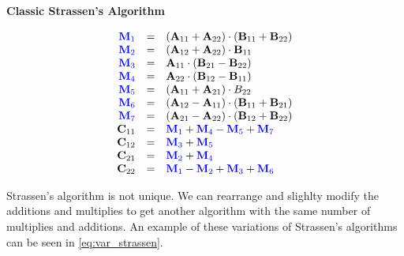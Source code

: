     \begin{center}
        \textbf{Classic Strassen's Algorithm}
        \vspace{-20pt}
    \end{center}
    \begin{equation}
        \begin{array}{rcl}
            \color{blue} \mathbf{M}_1 & = & (\mathbf{A}_{11} + \mathbf{A}_{22})\cdot (\mathbf{B}_{11} + \mathbf{B}_{22}) \\
            \color{blue} \mathbf{M}_2 & = & (\mathbf{A}_{12} + \mathbf{A}_{22})\cdot \mathbf{B}_{11} \\
            \color{blue} \mathbf{M}_3 & = & \mathbf{A}_{11}\cdot (\mathbf{B}_{21} - \mathbf{B}_{22}) \\
            \color{blue} \mathbf{M}_4 & = & \mathbf{A}_{22}\cdot (\mathbf{B}_{12} - \mathbf{B}_{11}) \\
            \color{blue} \mathbf{M}_5 & = & (\mathbf{A}_{11} + \mathbf{A}_{21})\cdot B_{22} \\
            \color{blue} \mathbf{M}_6 & = & (\mathbf{A}_{12} - \mathbf{A}_{11})\cdot (\mathbf{B}_{11} + \mathbf{B}_{21}) \\
            \color{blue} \mathbf{M}_7 & = & (\mathbf{A}_{21} - \mathbf{A}_{22})\cdot (\mathbf{B}_{12} + \mathbf{B}_{22}) \\
            \mathbf{C}_{11} & = & \color{blue} \mathbf{M}_1 \color{black} + \color{blue} \mathbf{M}_4 \color{black} - \color{blue} \mathbf{M}_5 \color{black} + \color{blue} \mathbf{M}_7 \\
            \mathbf{C}_{12} & = & \color{blue} \mathbf{M}_3 \color{black} + \color{blue} \mathbf{M}_5 \\
            \mathbf{C}_{21} & = & \color{blue} \mathbf{M}_2 \color{black} + \color{blue} \mathbf{M}_4 \\
            \mathbf{C}_{22} & = & \color{blue} \mathbf{M}_1 \color{black} - \color{blue} \mathbf{M}_2 \color{black} + \color{blue} \mathbf{M}_3 \color{black} + \color{blue} \mathbf{M}_6
        \end{array}
        \label{eq:classic_strassen}
    \end{equation}



    Strassen's algorithm is not unique. We can rearrange and slighlty modify the
    additions and multiplies to get another algorithm with the same number of
    multiplies and additions. An example of these variations of Strassen's
    algorithms can be seen in \ref{eq:var_strassen}. 


